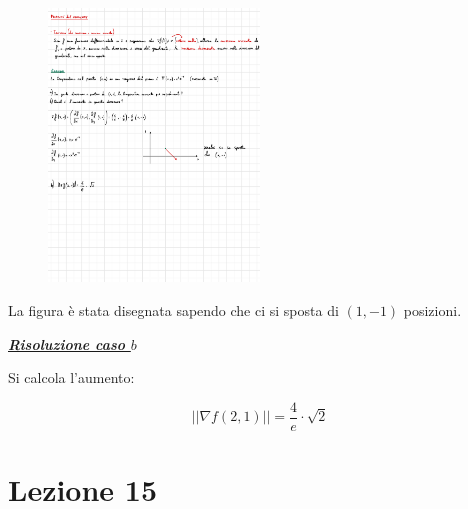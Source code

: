 \documentclass[a4paper]{article}
\begin{document}
	\begin{figure}[!htp]
		\centering
		\includegraphics[width=0.5\textwidth]{img/proprieta_del_gradiente.pdf}
	\end{figure}

	\noindent
	La figura è stata disegnata sapendo che ci si sposta di $\left(1,-1\right)$ posizioni.\newline
	
	\noindent
	\textcolor{Green4}{\textbf{\emph{\underline{Risoluzione caso $b$}}}}\newline
	
	\noindent
	Si calcola l'aumento:
	
	\begin{equation*}
		\Big||\nabla f\left(2,1\right)|\Big| = \dfrac{4}{e} \cdot \sqrt{2}
	\end{equation*}

	\newpage
	
	\section{Lezione 15}
\end{document}
